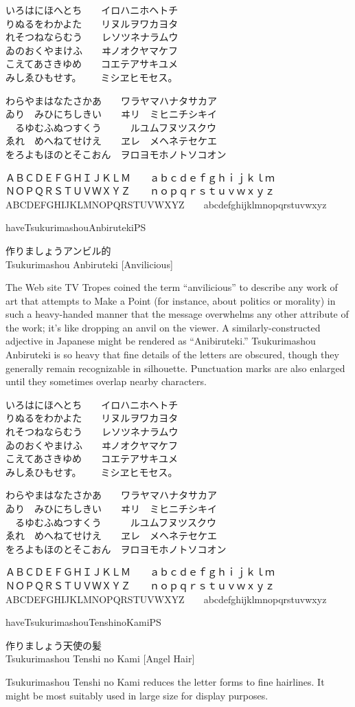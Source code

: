 \documentclass[14pt]{extarticle}
\newcommand{\iroha}{%
いろはにほへとち~~~~イロハニホヘトチ\\
りぬるをわかよた~~~~リヌルヲワカヨタ\\
れそつねならむう~~~~レソツネナラムウ\\
ゐのおくやまけふ~~~~ヰノオクヤマケフ\\
こえてあさきゆめ~~~~コエテアサキユメ\\
みしゑひもせす。~~~~ミシヱヒモセス。\par
}
\newcommand{\gojuuonzu}{%
わらやまはなたさかあ~~~~ワラヤマハナタサカア\\
ゐり~~みひにちしきい~~~~ヰリ~~ミヒニチシキイ\\
~~るゆむふぬつすくう~~~~~~ルユムフヌツスクウ\\
ゑれ~~めへねてせけえ~~~~ヱレ~~メヘネテセケエ\\
をろよもほのとそこおん~~ヲロヨモホノトソコオン\par
}
\begin{document}
\marumono
\iroha
\gojuuonzu

ＡＢＣＤＥＦＧＨＩＪＫＬＭ~~~~ａｂｃｄｅｆｇｈｉｊｋｌｍ\\
ＮＯＰＱＲＳＴＵＶＷＸＹＺ~~~~ｎｏｐｑｒｓｔｕｖｗｘｙｚ\\
ABCDEFGHIJKLMNOPQRSTUVWXYZ~~~~abcdefghijklmnopqrstuvwxyz

\clearpage

\fi


\expandafter\ifx\csname haveTsukurimashouAnbirutekiPS\endcsname\relax\else

\anbiruteki

\Large
作りましょうアンビル的\\
Tsukurimashou Anbiruteki [Anvilicious]

\normalsize

The Web site TV Tropes coined the term ``anvilicious'' to describe any work
of art that attempts to Make a Point (for instance, about politics or
morality) in such a heavy-handed manner that the message overwhelms any
other attribute of the work; it's like dropping an anvil on the viewer.  A
similarly-constructed adjective in Japanese might be rendered as
``Anibiruteki.'' Tsukurimashou Anbiruteki is so heavy that fine details of
the letters are obscured, though they generally remain recognizable in
silhouette.  Punctuation marks are also enlarged until they sometimes
overlap nearby characters.

\anbirutekimono
\iroha
\gojuuonzu

ＡＢＣＤＥＦＧＨＩＪＫＬＭ~~~~ａｂｃｄｅｆｇｈｉｊｋｌｍ\\
ＮＯＰＱＲＳＴＵＶＷＸＹＺ~~~~ｎｏｐｑｒｓｔｕｖｗｘｙｚ\\
ABCDEFGHIJKLMNOPQRSTUVWXYZ~~~~abcdefghijklmnopqrstuvwxyz

\clearpage

\fi


\expandafter\ifx\csname haveTsukurimashouTenshinoKamiPS\endcsname\relax\else

\tenshinokami

\Large
作りましょう天使の髪\\
Tsukurimashou Tenshi no Kami [Angel Hair]

\normalsize

Tsukurimashou Tenshi no Kami reduces the letter forms to fine hairlines.  It
might be most suitably used in large size for display purposes.
\end{document}
